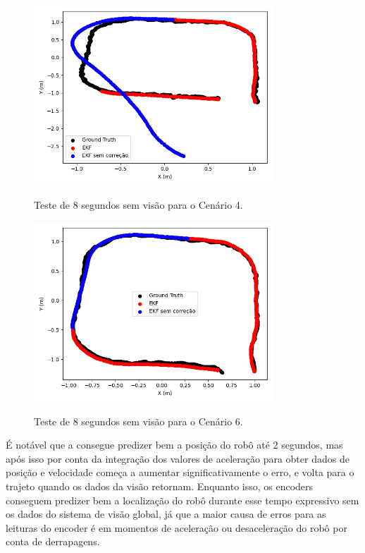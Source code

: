 \documentclass[acronym, symbols, table, deposito]{fei}
\begin{document}
		\begin{figure}[!htb]
			\centering
			\caption{Teste de 8 segundos sem visão para o Cenário 4.}
			\includegraphics[width=0.8\textwidth]{teste_imu_8s.png}
			\label{fig:teste_imu_8s}
		\end{figure}
		
		\begin{figure}[!htb]
			\centering
			\caption{Teste de 8 segundos sem visão para o Cenário 6.}
			\includegraphics[width=0.8\textwidth]{teste_encoder_8s.png}
			\label{fig:teste_encoder_8s}
		\end{figure}
	
		É notável que a  consegue predizer bem a posição do robô até 2 segundos, mas após isso por conta da integração dos valores de aceleração para obter dados de posição e velocidade começa a aumentar significativamente o erro, e volta para o trajeto quando os dados da visão retornam. Enquanto isso, os encoders conseguem predizer bem a localização do robô durante esse tempo expressivo sem os dados do sistema de visão global, já que a maior causa de erros para as leituras do encoder é em momentos de aceleração ou desaceleração do robô por conta de derrapagens.
		
\end{document}
